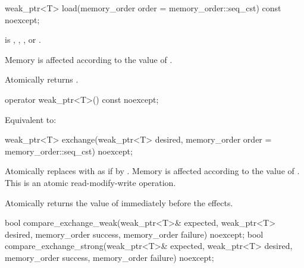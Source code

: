 %
\begin{itemdecl}
weak_ptr<T> load(memory_order order = memory_order::seq_cst) const noexcept;
\end{itemdecl}

\begin{itemdescr}
\pnum
\expects
{} is
,
,
, or
.

\pnum
\effects
Memory is affected according to the value of .

\pnum
\returns
Atomically returns .
\end{itemdescr}

%
\begin{itemdecl}
operator weak_ptr<T>() const noexcept;
\end{itemdecl}

\begin{itemdescr}
\pnum
\effects
Equivalent to: 
\end{itemdescr}

%
\begin{itemdecl}
weak_ptr<T> exchange(weak_ptr<T> desired, memory_order order = memory_order::seq_cst) noexcept;
\end{itemdecl}

\begin{itemdescr}
\pnum
\effects
Atomically replaces  with 
as if by .
Memory is affected according to the value of .
This is an atomic read-modify-write operation.

\pnum
\returns
Atomically returns the value of  immediately before the effects.
\end{itemdescr}

%
\begin{itemdecl}
bool compare_exchange_weak(weak_ptr<T>& expected, weak_ptr<T> desired,
                           memory_order success, memory_order failure) noexcept;
bool compare_exchange_strong(weak_ptr<T>& expected, weak_ptr<T> desired,
                             memory_order success, memory_order failure) noexcept;
\end{itemdecl}

